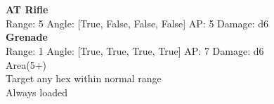 \ \\

\ \\
{\bf AT Rifle } \\



Range: 5  Angle: [True, False, False, False] AP: 5 Damage: d6 \\




{\bf Grenade } \\



Range: 1  Angle: [True, True, True, True] AP: 7 Damage: d6 \\
Area(5+)\\ 
Target any hex within normal range\\ 
Always loaded\\ 




 
\ \\














